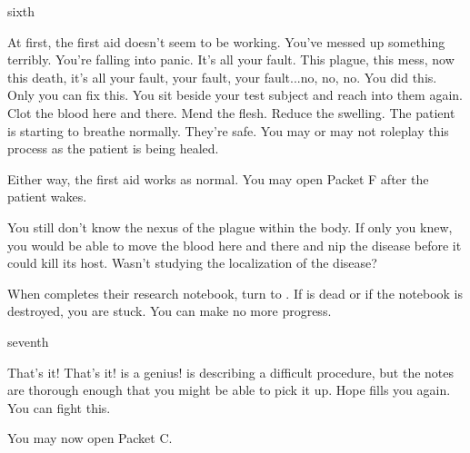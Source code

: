 \documentclass[greennotebook]{Pestilence} %
\begin{document}
\begin{page}{sixth}

At first, the first aid doesn't seem to be working. You've messed up something terribly. You're falling into panic. It's all your fault. This plague, this mess, now this death, it's all your fault, your fault, your fault...no, no, no. You did this. Only you can fix this. You sit beside your test subject and reach into them again. Clot the blood here and there. Mend the flesh. Reduce the swelling. The patient is starting to breathe normally. They're safe. You may or may not roleplay this process as the patient is being healed. 

Either way, the first aid works as normal. You may open Packet F after the patient wakes. 

You still don't know the nexus of the plague within the body. If only you knew, you would be able to move the blood here and there and nip the disease before it could kill its host. Wasn't \cOutsider{} studying the localization of the disease?

When \cOutsider{} completes their research notebook, turn to . If \cOutsider{} is dead or if the notebook is destroyed, you are stuck. You can make no more progress.

\end{page}

\begin{page}{seventh}

That's it! That's it! \cOutsider{} is a genius! \cOutsider{\They} is describing a difficult procedure, but the notes are thorough enough that you might be able to pick it up. Hope fills you again. You can fight this.

You may now open Packet C.

\end{page}

\endnotebook
\end{document}
